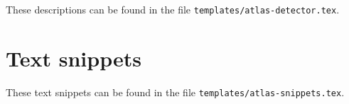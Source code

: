 \documentclass[PAPER,UKenglish]{latex/atlasdoc}
\newcommand{\File}[1]{\texttt{#1}\xspace}
\begin{document}
These descriptions can be found in the file \File{templates/atlas-detector.tex}.




\section{Text snippets}
\label{app:snippet}

These text snippets can be found in the file \File{templates/atlas-snippets.tex}.


\end{document}
